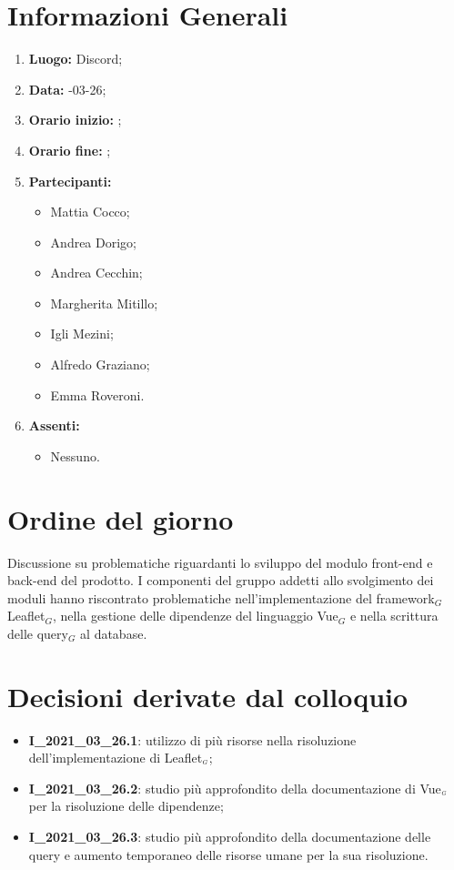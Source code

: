 \newpage
\section{Informazioni Generali}
\begin{enumerate}
	\item \textbf{Luogo:} \normalfont  Discord;
	\item \textbf{Data:} -03-26;
	\item \textbf{Orario inizio:} ;
	\item \textbf{Orario fine:} ;
	\item \textbf{Partecipanti:}
	\begin{itemize}
		\item Mattia Cocco;
		\item Andrea Dorigo;
		\item Andrea Cecchin;
		\item Margherita Mitillo;
		\item Igli Mezini;
		\item Alfredo Graziano;
		\item Emma Roveroni.
	\end{itemize}
	\item \textbf{Assenti:}
	\begin{itemize}
		\item Nessuno.
	\end{itemize}
\end{enumerate}
\section{Ordine del giorno}
Discussione su problematiche riguardanti lo sviluppo del modulo front-end e back-end del prodotto. I componenti del gruppo addetti allo svolgimento dei moduli hanno riscontrato problematiche nell'implementazione del framework$_G$ Leaflet$_G$, nella gestione delle dipendenze del linguaggio Vue$_G$ e nella scrittura delle query$_G$ al database.

\section{Decisioni derivate dal colloquio}
\begin{itemize}
	\item \textbf{I\_2021\_03\_26.1}: utilizzo di più risorse nella risoluzione dell'implementazione di Leaflet$_{\scaleto{G}{3pt}}$;
	\item \textbf{I\_2021\_03\_26.2}: studio più approfondito della documentazione di Vue$_{\scaleto{G}{3pt}}$ per la risoluzione delle dipendenze;
	\item \textbf{I\_2021\_03\_26.3}: studio più approfondito della documentazione delle query e aumento temporaneo delle risorse umane per la sua risoluzione.
\end{itemize}